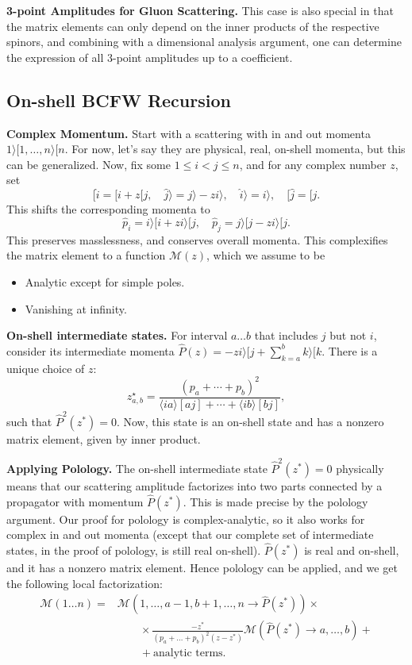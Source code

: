 \textbf{3-point Amplitudes for Gluon Scattering.} This case is also special in that the matrix elements can only depend on the inner products of the respective spinors, and combining with a dimensional analysis argument, one can determine the expression of all 3-point amplitudes up to a coefficient. 



\subsection{On-shell BCFW Recursion}

\textbf{Complex Momentum.} 
Start with a scattering with in and out momenta $1 \rangle[1, \ldots, n \rangle [n $. For now, let's say they are physical, real, on-shell momenta, but this can be generalized. Now, fix some $1 \le i < j \le n$, and for any complex number $z$, set
\[
	[\hat{i} = [i + z [j, \quad
	\hat{j} \rangle = j \rangle - z i \rangle, \quad
	\hat{i} \rangle = i \rangle, \quad
	[ \hat{j} = [ j
.\]
This shifts the corresponding momenta to
\[
	\hat{p} _i = i \rangle [i + z i \rangle [j , \quad
	\hat{p} _j = j \rangle [j - z i \rangle [j
.\] 
This preserves masslessness, and conserves overall momenta. This complexifies the matrix element to a function $\mathcal{M}(z)$, which we assume to be
\begin{itemize}
	\item Analytic except for simple poles.
	\item Vanishing at infinity.
\end{itemize}

\textbf{On-shell intermediate states.} For interval $a \ldots b$ that includes $j$ but not $i$, consider its intermediate momenta $\hat{P} (z) = - z i \rangle [j + \sum_{k = a}^b k \rangle [k$. There is a unique choice of $z$:
\[
z_{a, b}^{\star}=\frac{\left(p_a+\cdots+p_b\right)^2}{\langle i a\rangle[a j]+\cdots+\langle i b\rangle[b j]}
,\] 
such that $\hat{P} ^2(z^*) = 0$. Now, this state is an on-shell state and has a nonzero matrix element, given by inner product.

\textbf{Applying Polology.} The on-shell intermediate state $\hat{P}^2(z^*) = 0$ physically means that our scattering amplitude factorizes into two parts connected by a propagator with momentum $\hat{P} (z^*)$. This is made precise by the polology argument. Our proof for polology is complex-analytic, so it also works for complex in and out momenta (except that our complete set of intermediate states, in the proof of polology, is still real on-shell). $\hat{P} (z^*)$ is real and on-shell, and it has a nonzero matrix element. Hence polology can be applied, and we get the following local factorization:
\begin{align*}
	\mathcal{M}(1 \ldots n) = &\mathcal{M}\left( 1, \ldots, a-1, b+1 , \ldots, n \to \hat{P} (z^*) \right) \times \\
	&\qquad \times  \frac{- z^*}{(p_a + \ldots + p_b)^2 (z - z^*)} \mathcal{M}\left( \hat{P} (z^*) \to a, \ldots, b \right) + \\
	& \qquad + \text{analytic terms}
.\end{align*} 

